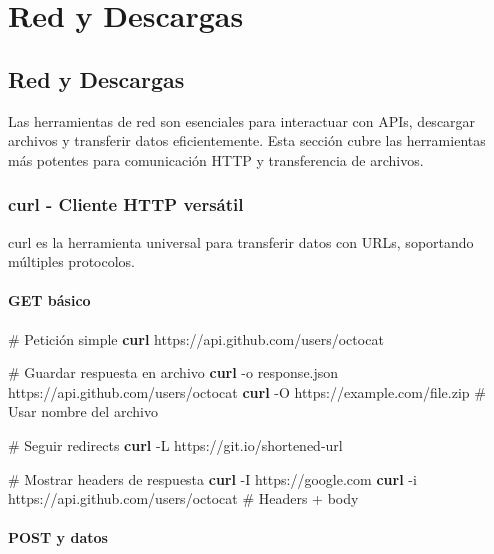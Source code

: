 \documentclass[
  11pt,
  letterpaper,
  oneside,
  openany]{scrbook}
\newenvironment{Shaded}{}{}
\newcommand{\AttributeTok}[1]{\textcolor[rgb]{0.84,0.23,0.29}{#1}}
\newcommand{\CommentTok}[1]{\textcolor[rgb]{0.42,0.45,0.49}{#1}}
\newcommand{\ExtensionTok}[1]{\textcolor[rgb]{0.84,0.23,0.29}{\textbf{#1}}}
\newcommand{\NormalTok}[1]{\textcolor[rgb]{0.14,0.16,0.18}{#1}}
\begin{document}
\part{Red y Descargas}

\chapter{Red y Descargas}\label{red-y-descargas-2}

Las herramientas de red son esenciales para interactuar con APIs,
descargar archivos y transferir datos eficientemente. Esta sección cubre
las herramientas más potentes para comunicación HTTP y transferencia de
archivos.

\section{curl - Cliente HTTP versátil}\label{sec-curl}

curl es la herramienta universal para transferir datos con URLs,
soportando múltiples protocolos.

\subsection{GET básico}\label{get-buxe1sico}

\begin{Shaded}
\begin{Highlighting}[]
\CommentTok{\# Petición simple}
\ExtensionTok{curl}\NormalTok{ https://api.github.com/users/octocat}

\CommentTok{\# Guardar respuesta en archivo}
\ExtensionTok{curl} \AttributeTok{{-}o}\NormalTok{ response.json https://api.github.com/users/octocat}
\ExtensionTok{curl} \AttributeTok{{-}O}\NormalTok{ https://example.com/file.zip  }\CommentTok{\# Usar nombre del archivo}

\CommentTok{\# Seguir redirects}
\ExtensionTok{curl} \AttributeTok{{-}L}\NormalTok{ https://git.io/shortened{-}url}

\CommentTok{\# Mostrar headers de respuesta}
\ExtensionTok{curl} \AttributeTok{{-}I}\NormalTok{ https://google.com}
\ExtensionTok{curl} \AttributeTok{{-}i}\NormalTok{ https://api.github.com/users/octocat  }\CommentTok{\# Headers + body}
\end{Highlighting}
\end{Shaded}

\subsection{POST y datos}\label{post-y-datos}
\end{document}
